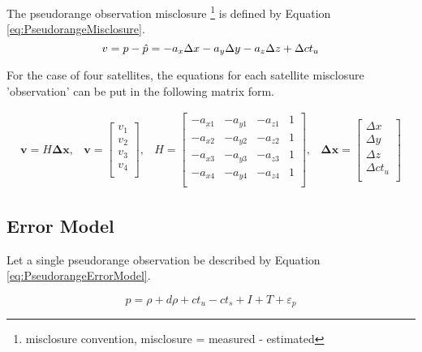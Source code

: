 \documentclass[11pt,letterpaper]{article}
\begin{document}
The pseudorange observation misclosure \footnote{misclosure convention, misclosure = measured - estimated} is defined by Equation \ref{eq:PseudorangeMisclosure}.
\begin{equation} \label{eq:PseudorangeMisclosure}
v = p - \hat{p} = -a_x \Delta x -a_y \Delta y -a_z \Delta z + \Delta ct_u \\
\end{equation}

\pagebreak

For the case of four satellites, the equations for each satellite misclosure 'observation' can be put in the following matrix form.

\begin{equation} \label{eq:PseudorangeMatrixFormExample}
\begin{array}{cccc}
\mathbf{v} = H \mathbf{\Delta x}, & \mathbf{v} = \left[
\begin{array}{c}
v_1 \\
v_2 \\
v_3 \\
v_4 \\
\end{array}
\right], & H = \left[
\begin{array}{cccc}
-a_{x1} & -a_{y1} & -a_{z1} & 1 \\
-a_{x2} & -a_{y2} & -a_{z2} & 1 \\
-a_{x3} & -a_{y3} & -a_{z3} & 1 \\
-a_{x4} & -a_{y4} & -a_{z4} & 1 \\
\end{array}
\right], & \mathbf{\Delta x} = \left[
\begin{array}{c}
\Delta x \\
\Delta y \\
\Delta z \\
\Delta ct_u \\
\end{array}
\right]
\end{array}
\end{equation}

\subsection{Error Model}

Let a single pseudorange observation be described by Equation \ref{eq:PseudorangeErrorModel}.

\begin{equation} \label{eq:PseudorangeErrorModel}
p = \rho + d\rho + ct_u - ct_s + I + T + \varepsilon_{p}
\end{equation}
\end{document}
